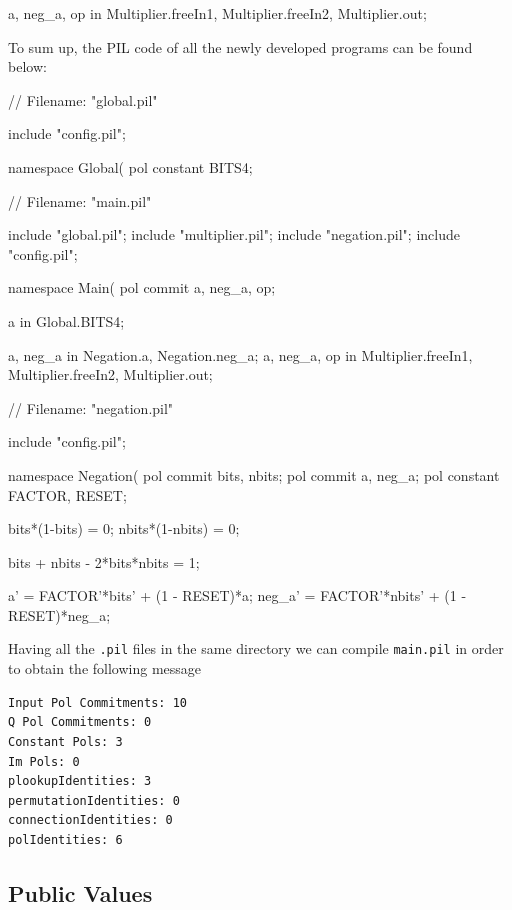 \begin{pil}
{a, neg_a, op} in {Multiplier.freeIn1, Multiplier.freeIn2, Multiplier.out};
\end{pil}

To sum up, the PIL code of all the newly developed programs can be found below:

\begin{pil}
// Filename: "global.pil"

include "config.pil";

namespace Global(%
    pol constant BITS4;
\end{pil}

\begin{pil}
// Filename: "main.pil"

include "global.pil";
include "multiplier.pil";
include "negation.pil";
include "config.pil";

namespace Main(%
    pol commit a, neg_a, op;

    a in Global.BITS4;

    {a, neg_a} in {Negation.a, Negation.neg_a};
    {a, neg_a, op} in {Multiplier.freeIn1, Multiplier.freeIn2, Multiplier.out};
\end{pil}

\begin{pil}
// Filename: "negation.pil"

include "config.pil";

namespace Negation(%
    pol commit bits, nbits;
    pol commit a, neg_a;
    pol constant FACTOR, RESET;

    bits*(1-bits) = 0;
    nbits*(1-nbits) = 0;

    bits + nbits - 2*bits*nbits = 1;

    a' = FACTOR'*bits' + (1 - RESET)*a;
    neg_a' = FACTOR'*nbits' + (1 - RESET)*neg_a;
\end{pil}

Having all the \texttt{.pil} files in the same directory we can compile \texttt{main.pil} in order to obtain the following message 

\begin{lstlisting}
Input Pol Commitments: 10
Q Pol Commitments: 0
Constant Pols: 3
Im Pols: 0
plookupIdentities: 3
permutationIdentities: 0
connectionIdentities: 0
polIdentities: 6
\end{lstlisting}




\subsection{Public Values}

